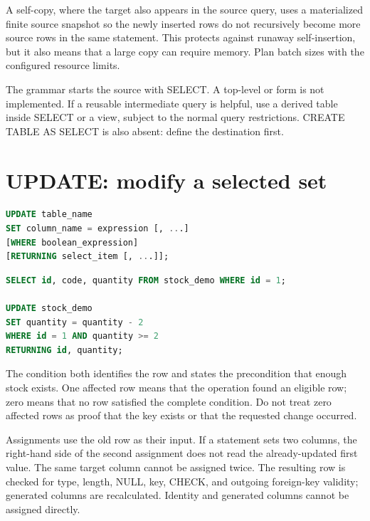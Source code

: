 A self-copy, where the target also appears in the source query, uses a materialized finite source snapshot so the newly inserted rows do not recursively become more source rows in the same statement. This protects against runaway self-insertion, but it also means that a large copy can require memory. Plan batch sizes with the configured resource limits.

The grammar starts the source with SELECT. A top-level  or  form is not implemented. If a reusable intermediate query is helpful, use a derived table inside SELECT or a view, subject to the normal query restrictions. CREATE TABLE AS SELECT is also absent: define the destination first.


\section{UPDATE: modify a selected set}

\begin{lstlisting}[language=SQL]
UPDATE table_name
SET column_name = expression [, ...]
[WHERE boolean_expression]
[RETURNING select_item [, ...]];
\end{lstlisting}

\begin{lstlisting}[language=SQL]
SELECT id, code, quantity FROM stock_demo WHERE id = 1;

UPDATE stock_demo
SET quantity = quantity - 2
WHERE id = 1 AND quantity >= 2
RETURNING id, quantity;
\end{lstlisting}

The condition both identifies the row and states the precondition that enough stock exists. One affected row means that the operation found an eligible row; zero means that no row satisfied the complete condition. Do not treat zero affected rows as proof that the key exists or that the requested change occurred.

Assignments use the old row as their input. If a statement sets two columns, the right-hand side of the second assignment does not read the already-updated first value. The same target column cannot be assigned twice. The resulting row is checked for type, length, NULL, key, CHECK, and outgoing foreign-key validity; generated columns are recalculated. Identity and generated columns cannot be assigned directly.

